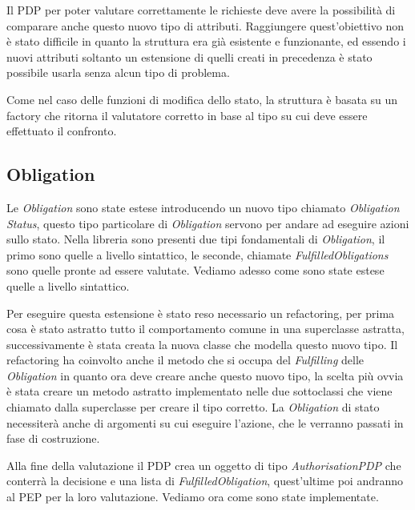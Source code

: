Il \ac{PDP} per poter valutare correttamente le richieste deve avere la possibilità di comparare anche questo nuovo tipo di attributi.
Raggiungere quest'obiettivo non è stato difficile in quanto la struttura era già esistente e funzionante, ed essendo i nuovi attributi soltanto un estensione di quelli 
creati in precedenza è stato possibile usarla senza alcun tipo di problema.\par


Come nel caso delle funzioni di modifica dello stato, la struttura è basata su un factory che ritorna il valutatore corretto in base al tipo su cui deve essere effettuato il confronto.

\subsection{Obligation}
\label{sub:estensione_obligation}
Le \textit{Obligation} sono state estese introducendo un nuovo tipo chiamato \textit{Obligation Status}, questo tipo particolare di \textit{Obligation} servono per andare ad eseguire azioni sullo stato.
Nella libreria sono presenti due tipi fondamentali di \textit{Obligation}, il primo sono quelle a livello sintattico, le seconde, chiamate \textit{FulfilledObligations} sono quelle pronte ad essere valutate. Vediamo adesso come sono state estese quelle a livello sintattico. \par
Per eseguire questa estensione è stato reso necessario un refactoring, per prima cosa è stato astratto tutto il comportamento comune in una superclasse astratta, successivamente è stata creata la nuova classe che modella questo nuovo tipo.
Il refactoring ha coinvolto anche il metodo che si occupa del \textit{Fulfilling} delle \textit{Obligation} in quanto ora deve creare anche questo nuovo tipo, la scelta più ovvia è stata creare un metodo astratto implementato nelle due sottoclassi che viene chiamato dalla superclasse per creare il tipo corretto.
La \textit{Obligation} di stato necessiterà anche di argomenti su cui eseguire l'azione, che le verranno passati in fase di costruzione. \par
Alla fine della valutazione il \ac{PDP} crea un oggetto di tipo \textit{AuthorisationPDP} che conterrà la decisione e una lista di \textit{FulfilledObligation}, quest'ultime poi andranno al \ac{PEP} per la loro valutazione. Vediamo ora come sono state implementate. \par
